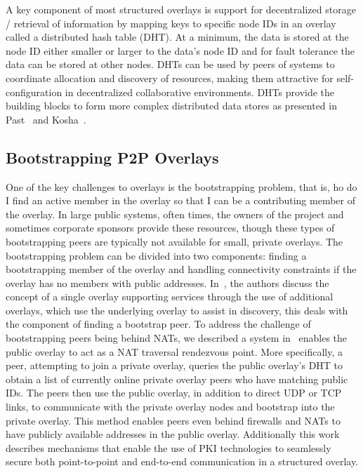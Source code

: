 \documentclass[conference]{IEEEtran}
\begin{document}
A key component of most structured overlays is support for decentralized
storage / retrieval of information by mapping keys to specific node IDs in an
overlay called a distributed hash table (DHT).  At a minimum, the data is
stored at the node ID either smaller or larger to the data's node ID and for
fault tolerance the data can be stored at other nodes.  DHTs can be used by
peers of systems to coordinate allocation and discovery of resources, making
them attractive for self-configuration in decentralized collaborative
environments.  DHTs provide the building blocks to form more complex
distributed data stores as presented in Past~\cite{past} and
Kosha~\cite{kosha}.

\subsection{Bootstrapping P2P Overlays}

One of the key challenges to overlays is the bootstrapping problem, that is,
ho do I find an active member in the overlay so that I can be a contributing
member of the overlay.  In large public systems, often times, the owners of
the project and sometimes corporate sponsors provide these resources, though
these types of bootstrapping peers are typically not available for small,
private overlays.  The bootstrapping problem can be divided into two
components: finding a bootstrapping member of the overlay and handling
connectivity constraints if the overlay has no members with public addresses.
In~\cite{one_ring, can_multicast}, the authors discuss the concept of a single
overlay supporting services through the use of additional overlays, which use
the underlying overlay to assist in discovery, this deals with the component
of finding a bootstrap peer.  To address the challenge of bootstrapping peers
being behind NATs, we described a system in~\cite{vpo} enables the public
overlay to act as a NAT traversal rendezvous point.  More specifically, a
peer, attempting to join a private overlay, queries the public overlay's DHT
to obtain a list of currently online private overlay peers who have matching
public IDs.  The peers then use the public overlay, in addition to direct UDP
or TCP links, to communicate with the private overlay nodes and bootstrap into
the private overlay.  This method enables peers even behind firewalls and NATs
to have publicly available addresses in the public overlay.  Additionally this
work describes mechanisms that enable the use of PKI technologies to
seamlessly secure both point-to-point and end-to-end communication in a
structured overlay.
\end{document}

